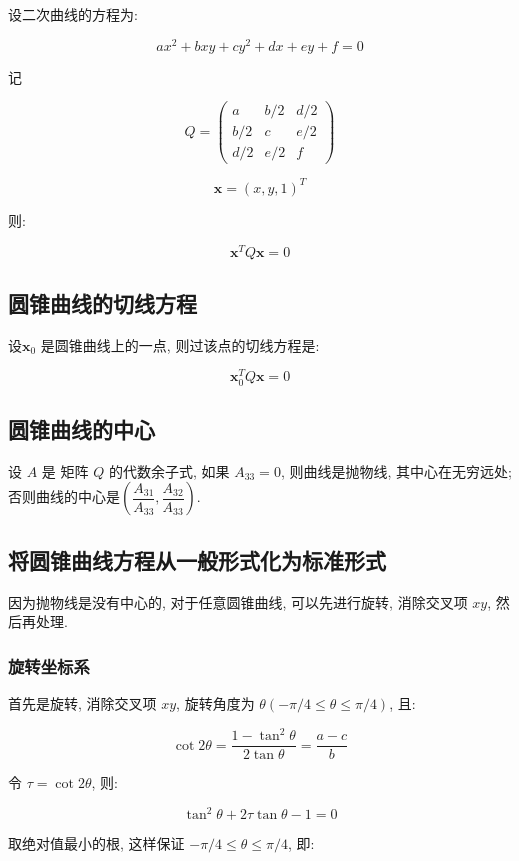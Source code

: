 设二次曲线的方程为:

\[
  ax^2 + bxy + cy^2 + dx + ey + f = 0
\]

记

\[
  Q = \begin{pmatrix}
    a & b/2 & d/2\\
    b/2 & c & e/2\\
    d/2 & e/2 & f
  \end{pmatrix}
\]

\[
  \mathbf{x} = (x,y,1)^T
\]

则:

\[
  \mathbf{x}^T Q \mathbf{x} = 0
\]

\subsection{圆锥曲线的切线方程}

设$\mathbf{x}_0$ 是圆锥曲线上的一点, 则过该点的切线方程是:

\[
  \mathbf{x}_0^T Q \mathbf{x} = 0
\]

\subsection{圆锥曲线的中心}

设 $A$ 是 矩阵 $Q$ 的代数余子式, 如果 $A_{33} = 0$, 则曲线是抛物线, 其中心在无穷远处;
否则曲线的中心是$\left(\dfrac{A_{31}}{A_{33}}, \dfrac{A_{32}}{A_{33}}\right)$.


\subsection{将圆锥曲线方程从一般形式化为标准形式}

因为抛物线是没有中心的, 对于任意圆锥曲线, 可以先进行旋转, 消除交叉项 $xy$, 然后再处理.

\subsubsection{旋转坐标系}

首先是旋转, 消除交叉项 $xy$, 旋转角度为 $\theta(-\pi/4 \leq \theta \leq \pi/4)$, 且:

\[
  \cot2\theta = \dfrac{1-\tan^2\theta}{2\tan\theta} = \dfrac{a-c}{b}
\]

令 $\tau = \cot2\theta$, 则:

\[
  \tan^2\theta + 2\tau \tan\theta -1 = 0
\]

取绝对值最小的根, 这样保证 $-\pi/4 \leq \theta \leq \pi/4$, 即:

